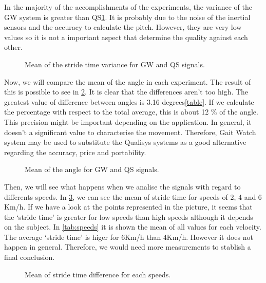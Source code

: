 In the majority of the accomplishments of the experiments, the variance of the GW system is greater than QS\ref{fig:var_stride_time}. It is probably due to the noise of the inertial sensors and the accuracy to calculate the pitch. However, they are very low values so it is not a important aspect that determine the quality against each other. 

\begin{figure}[H]
	\centering
	\caption{Mean of the stride time variance for GW and QS signals.}
	\label{fig:var_stride_time}
\end{figure}

Now, we will compare the mean of the angle in each experiment. The result of this is possible to see in \ref{fig:mean_angle}. It is clear that the differences aren’t too high. The greatest value of difference between angles is 3.16 degrees\ref{table}. If we calculate the percentage with respect to the total average, this is about 12 \% of the angle. This precision might be important depending on the application. In general, it doesn’t a significant value to characterise the movement. Therefore, Gait Watch system may be used to substitute the Qualisys systems as a good alternative regarding the accuracy, price and portability.

\begin{figure}[H]
	\centering
	\caption{Mean of the angle for GW and QS signals.}
	\label{fig:mean_angle}
\end{figure}

Then, we will see what happens when we analise the signals with regard to differents speeds. In \ref{fig:speed_stride_time}, we can see the mean of stride time for speeds of 2, 4 and 6 Km/h. If we have a look at the points represented in the picture, it seems that the ‘stride time’ is greater for low speeds than high speeds although it depends on the subject. In \ref{tab:speeds} it is shown the mean of all values for each velocity. The average ‘stride time’ is higer for 6Km/h than 4Km/h. However it does not happen in general. Therefore, we would need more measurements to stablish a final conclusion.

\begin{figure}[H]
	\centering
	\caption{Mean of stride time difference for each speeds.}
	\label{fig:speed_stride_time}
\end{figure}

